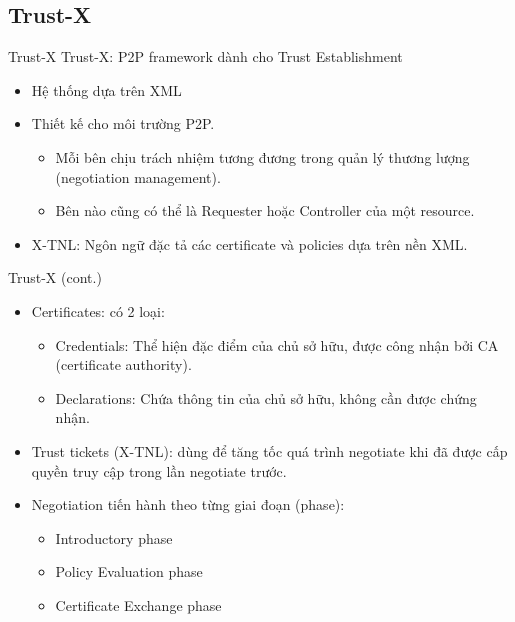 \documentclass[11pt]{beamer}
\begin{document}
\subsection{Trust-X}
\begin{frame}{Trust-X}
Trust-X: P2P framework dành cho Trust Establishment\cite{10.1109/TKDE.2004.1318565}
\begin{itemize}
\item Hệ thống dựa trên XML
\item Thiết kế cho môi trường P2P.
\begin{itemize}
\item Mỗi bên chịu trách nhiệm tương đương trong quản lý thương lượng (negotiation management).
\item Bên nào cũng có thể là Requester hoặc Controller của một resource.
\end{itemize}
\item X-TNL: Ngôn ngữ đặc tả các certificate và policies dựa trên nền XML.
\end{itemize}
\end{frame}

\begin{frame}{Trust-X (cont.)}
\begin{itemize}
\item Certificates: có 2 loại:
\begin{itemize}
\item Credentials: Thể hiện đặc điểm của chủ sở hữu, được công nhận bởi CA (certificate authority).
\item Declarations: Chứa thông tin của chủ sở hữu, không cần được chứng nhận.
\end{itemize}
\item Trust tickets (X-TNL): dùng để tăng tốc quá trình negotiate khi đã được cấp quyền truy cập trong lần negotiate trước.
\item Negotiation tiến hành theo từng giai đoạn (phase):
\begin{itemize}
\item Introductory phase
\item Policy Evaluation phase
\item Certificate Exchange phase
\end{itemize}
\end{itemize}
\end{frame}
\end{document}
